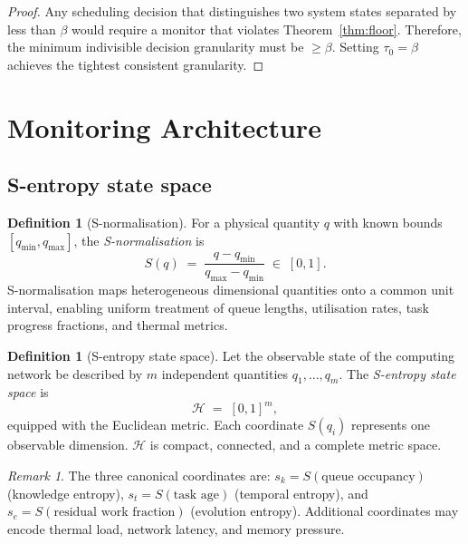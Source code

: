 \documentclass[11pt,twocolumn,a4paper]{article}
\theoremstyle{plain}
\theoremstyle{definition}
\newtheorem{definition}[theorem]{Definition}
\theoremstyle{remark}
\newtheorem{remark}[theorem]{Remark}
\newcommand{\H}{\mathcal{H}}
\newcommand{\tick}{\tau_0}
\newcommand{\floor}{\beta}
\newcommand{\Scal}{S}
\begin{document}
\begin{proof}
Any scheduling decision that distinguishes two system states separated by less than $\floor$ would require a monitor that violates Theorem~\ref{thm:floor}. Therefore, the minimum indivisible decision granularity must be $\geq \floor$. Setting $\tick = \floor$ achieves the tightest consistent granularity.
\end{proof}

\section{Monitoring Architecture}
\label{sec:monitor}

\subsection{S-entropy state space}

\begin{definition}[S-normalisation]
\label{def:snorm}
For a physical quantity $q$ with known bounds $[q_{\min}, q_{\max}]$, the \emph{S-normalisation} is
\[
  \Scal(q) \;=\; \frac{q - q_{\min}}{q_{\max} - q_{\min}} \;\in\; [0,1].
\]
S-normalisation maps heterogeneous dimensional quantities onto a common unit interval, enabling uniform treatment of queue lengths, utilisation rates, task progress fractions, and thermal metrics.
\end{definition}

\begin{definition}[S-entropy state space]
\label{def:sspace}
Let the observable state of the computing network be described by $m$ independent quantities $q_1, \ldots, q_m$. The \emph{S-entropy state space} is
\[
  \H \;=\; [0,1]^m,
\]
equipped with the Euclidean metric. Each coordinate $\Scal(q_i)$ represents one observable dimension. $\H$ is compact, connected, and a complete metric space.
\end{definition}

\begin{remark}
The three canonical coordinates are: $s_k = \Scal(\text{queue occupancy})$ (knowledge entropy), $s_t = \Scal(\text{task age})$ (temporal entropy), and $s_e = \Scal(\text{residual work fraction})$ (evolution entropy). Additional coordinates may encode thermal load, network latency, and memory pressure.
\end{remark}
\end{document}
